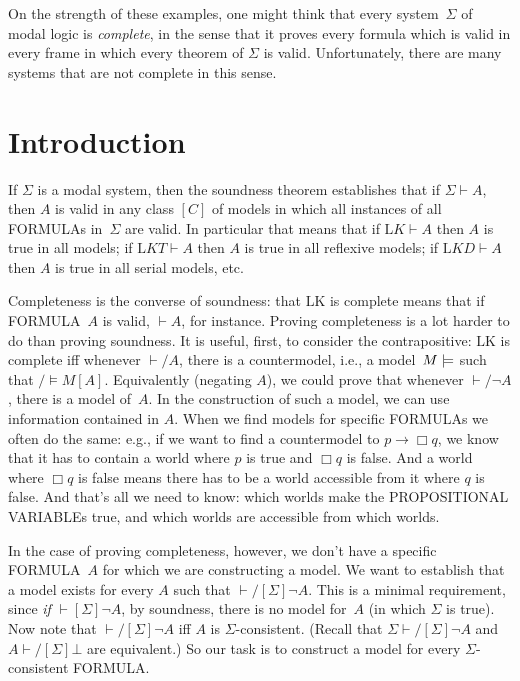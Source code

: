 \documentclass[10pt,a4paper]{article}
\newcommand*{\olup}[1]{\MakeUppercase{#1}}
\theoremstyle{plain}
\theoremstyle{definition}
\theoremstyle{remark}
\newcommand*{\olfileid}[3]{}
\newcommand*{\olsection}[1]{\section*{#1}}
\providecommand{\lif}{\mathbin{\rightarrow}}
\providecommand{\lfalse}{\bot}
\providecommand{\Proves}{\mathrel{\vdash}}
\providecommand{\mSat}[3]{\ensuremath{#1 \models #2[#3]}}
\providecommand{\mModel}[2]{\ensuremath{#1 \models #2}}
\providecommand{\Log}{\ensuremath{\mathrm{L}}}
\providecommand{\mClass}[1]{[#1]}
\begin{document}
On the strength of these examples, one might think that every
system~$\Sigma$ of modal logic is \emph{complete}, in the sense that
it proves every formula which is valid in every frame in which every
theorem of $\Sigma$ is valid. Unfortunately, there are many systems
that are not complete in this sense.





\olfileid{nml}{com}{int}

\olsection{Introduction}

If $\Sigma$ is a modal system, then the soundness theorem establishes
that if $\Sigma \Proves A$, then $A$ is valid in any class
$\mClass{C}$ of models in which all instances of all \olup{formula}s
in~$\Sigma$ are valid. In particular that means that if $\Log{K}
\Proves A$ then $A$ is true in all models; if $\Log{KT} \Proves A$
then $A$ is true in all reflexive models; if $\Log{KD} \Proves A$
then $A$ is true in all serial models, etc.

Completeness is the converse of soundness: that \Log{K} is complete
means that if \olup{formula}~$A$ is valid, $\Proves A$, for instance.
Proving completeness is a lot harder to do than proving soundness.  It
is useful, first, to consider the contrapositive: \Log{K} is complete
iff whenever $\Proves/ A$, there is a countermodel, i.e., a
model~$\mModel{M}$ such that $\mSat/{M}{A}$. Equivalently (negating
$A$), we could prove that whenever $\Proves/ \lnot A$, there is a
model of~$A$.  In the construction of such a model, we can use
information contained in $A$.  When we find models for specific
\olup{formula}s we often do the same: e.g., if we want to find a
countermodel to $p \lif \Box q$, we know that it has to contain a
world where $p$ is true and $\Box q$ is false. And a world where $\Box
q$ is false means there has to be a world accessible from it where $q$
is false. And that's all we need to know: which worlds make the
\olup{propositional variable}s true, and which worlds are accessible from
which worlds.

In the case of proving completeness, however, we don't have a specific
\olup{formula}~$A$ for which we are constructing a model. We want to
establish that a model exists for every $A$ such that
$\Proves/[\Sigma] \lnot A$. This is a minimal requirement, since
\emph{if} $\Proves[\Sigma] \lnot A$, by soundness, there is no model
for~$A$ (in which $\Sigma$ is true).  Now note that $\Proves/[\Sigma]
\lnot A$ iff $A$ is $\Sigma$-consistent.  (Recall that $\Sigma
\Proves/[\Sigma] \lnot A$ and $A \Proves/[\Sigma] \lfalse$ are
equivalent.)  So our task is to construct a model for every
$\Sigma$-consistent \olup{formula}.
\end{document}
